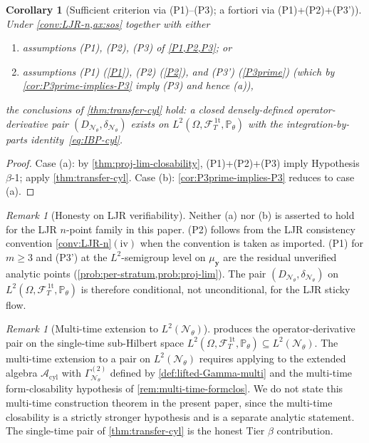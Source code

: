 \documentclass[11pt,reqno]{amsart}
\theoremstyle{plain}
\newtheorem{corollary}[theorem]{Corollary}
\theoremstyle{definition}
\theoremstyle{remark}
\newtheorem{remark}[theorem]{Remark}
\newcommand{\Prob}{\mathbb P}
\newcommand{\cA}{\mathcal A}
\newcommand{\cF}{\mathcal F}
\newcommand{\cN}{\mathcal N}
\newcommand{\Acyl}{\cA_{\mathrm{cyl}}}
\newcommand{\FT}{\cF_{T}^{\,\mathrm{1t}}}
\newcommand{\Hone}{L^{2}(\Omega,\FT,\Pth)}
\newcommand{\GamN}{\Gamma^{(2)}_{\cN_{\theta}}}
\newcommand{\DN}{D_{\cN_{\theta}}}
\newcommand{\divN}{\delta_{\cN_{\theta}}}
\newcommand{\Pth}{\Prob_{\theta}}
\begin{document}
\begin{corollary}[Sufficient criterion via (P1)--(P3); a fortiori
via (P1)+(P2)+(P3')]\label{cor:transfer-P}
Under \cref{conv:LJR-n,ax:sos} together with either
\begin{enumerate}
\item[$(\mathrm a)$] assumptions (P1), (P2), (P3) of
\cref{P1,P2,P3}; or
\item[$(\mathrm b)$] assumptions (P1) (\cref{P1}), (P2) (\cref{P2}),
and (P3') (\cref{P3prime}) (which by \cref{cor:P3prime-implies-P3}
imply (P3) and hence (a)),
\end{enumerate}
the conclusions of \cref{thm:transfer-cyl} hold: a closed
densely-defined operator-derivative pair $(\DN,\divN)$ exists on
$\Hone$ with the integration-by-parts
identity~\eqref{eq:IBP-cyl}.
\end{corollary}

\begin{proof}
Case (a): by \cref{thm:proj-lim-closability}, (P1)+(P2)+(P3) imply
Hypothesis~$\beta$-1; apply \cref{thm:transfer-cyl}. Case (b):
\cref{cor:P3prime-implies-P3} reduces to case (a).
\end{proof}

\begin{remark}[Honesty on LJR verifiability]\label{rem:transfer-honesty}
Neither (a) nor (b) is asserted to hold for the LJR $n$-point
family in this paper. (P2) follows from the LJR consistency
convention \cref{conv:LJR-n}$(\mathrm{iv})$ when the convention is
taken as imported. (P1) for $m\ge 3$ and (P3') at the
$L^{2}$-semigroup level on $\mu_{\mathbf y}$ are the residual
unverified analytic points
(\cref{prob:per-stratum,prob:proj-lim}). The pair $(\DN,\divN)$
on $\Hone$ is therefore conditional, not unconditional, for the
LJR sticky flow.
\end{remark}

\begin{remark}[Multi-time extension to $L^{2}(\cN_{\theta})$]\label{rem:transfer-multi}
 produces the operator-derivative pair on
the single-time sub-Hilbert space $\Hone\subseteq L^{2}(\cN_{\theta})$.
The multi-time extension to a pair on $L^{2}(\cN_{\theta})$ requires
applying \cite[Thm.~A]{GammaHierarchyDivergence} to the extended
algebra $\Acyl$ with $\GamN$ defined by
\cref{def:lifted-Gamma-multi} and the multi-time form-closability
hypothesis of \cref{rem:multi-time-formclos}. We do not state this
multi-time construction theorem in the present paper, since the
multi-time closability is a strictly stronger hypothesis and is a
separate analytic statement. The single-time pair of
\cref{thm:transfer-cyl} is the honest Tier $\beta$ contribution.
\end{remark}
\end{document}
